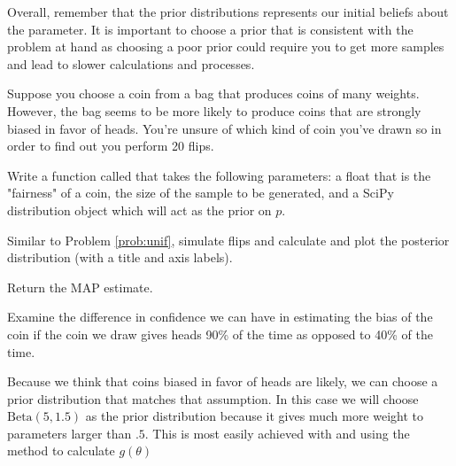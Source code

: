 Overall, remember that the prior distributions represents our initial beliefs about the parameter.
It is important to choose a prior that is consistent with the problem at hand as choosing a poor prior could require you to get more samples and lead to slower calculations and processes.

\begin{comment}
\subsection*{Updates}
Another important tool that is gained in using Bayesian methods is the Bayesian update.
This method is simple but brings important advantages.
The method of the Bayesian update is simply taking the posterior that has already been calculated, and using that as a prior in the next stage.

This method allows us to refine our guesses over time.
We may be in a situation where we are given a limited initial sample, and an estimate is required before a larger sample can be taken.
In these cases, we can compute the posterior given the first sample, then use that posterior as the prior when we receive our next sample.
This allow us to continually improve the confidence in our estimates and distribute that computation over a long period of time.
\end{comment}

\begin{problem}
  Suppose you choose a coin from a bag that produces coins of many weights.
  However, the bag seems to be more likely to produce coins that are strongly biased in favor of heads.
  You're unsure of which kind of coin you've drawn so in order to find out you perform 20 flips.

  Write a function called  that takes the following parameters:  a float that is the "fairness" of a coin,  the size of the sample to be generated, and  a SciPy distribution object which will act as the prior on $p$.


  Similar to Problem \ref{prob:unif}, simulate  flips and calculate and plot the posterior distribution (with a title and axis labels).

  Return the MAP estimate.

  Examine the difference in confidence we can have in estimating the bias of the coin if the coin we draw gives heads 90\% of the time as opposed to 40\% of the time.

  Because we think that coins biased in favor of heads are likely, we can choose a prior distribution that matches that assumption.
  In this case we will choose $\text{Beta}(5,1.5)$ as the prior distribution because it gives much more weight to parameters larger than $.5$.
  This is most easily achieved with  and using the  method to calculate $g(\theta)$
\end{problem}


